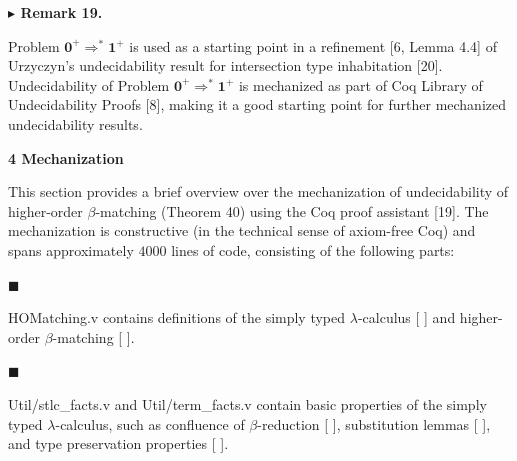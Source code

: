 \documentclass[10pt,a4paper]{amsart}
\begin{document}
 
 
 
\par\medskip\noindent\textbf{$\blacktriangleright$ Remark 19.}\par
 
 
Problem $\mathbf{0}^{+}\Rightarrow^{*}\mathbf{1}^{+}$ is used as a starting point in a refinement [6, Lemma 4.4] of Urzyczyn’s undecidability result for intersection type inhabitation [20]. Undecidability of Problem $\mathbf{0}^{+}\Rightarrow^{*}\mathbf{1}^{+}$ is mechanized as part of Coq Library of Undecidability Proofs [8], making it a good starting point for further mechanized undecidability results.\par
 
 
 
 

 
\par\medskip\noindent\textbf{4 Mechanization}\par
 
 
This section provides a brief overview over the mechanization of undecidability of higher-order $\beta$-matching (Theorem 40) using the Coq proof assistant [19]. The mechanization is constructive (in the technical sense of axiom-free Coq) and spans approximately $4000$ lines of code, consisting of the following parts:\par
  
\par\noindent  $\blacksquare$ 
 
HOMatching.v contains definitions of the simply typed $\lambda$-calculus [ ] and higher-order $\beta$-matching [ ].\par
 
 
 
\par\noindent  $\blacksquare$ 
 
Util/stlc\_facts.v and Util/term\_facts.v contain basic properties of the simply typed $\lambda$-calculus, such as confluence of $\beta$-reduction [ ], substitution lemmas [ ], and type preservation properties [ ].\par
 
\end{document}
